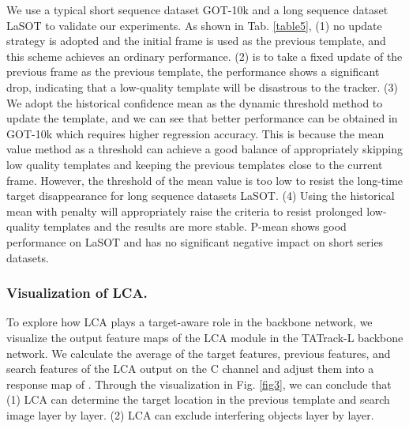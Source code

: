 \documentclass[letterpaper]{article} \usepackage{aaai23}  \usepackage{times}  \usepackage{helvet}  \usepackage{courier}  \usepackage[hyphens]{url}  \usepackage{graphicx} \urlstyle{rm} \def\UrlFont{\rm}  \usepackage{natbib}  \usepackage{caption} \frenchspacing  \setlength{\pdfpagewidth}{8.5in}  \setlength{\pdfpageheight}{11in}  \usepackage{algorithm}
\begin{document}
\begin{table}[t]
\centering
{}
\caption{Effects of different update strategies on long and short series datasets.}
\label{table5}
\end{table}


We use a typical short sequence dataset GOT-10k and a long sequence dataset LaSOT to validate our experiments. As shown in Tab. \ref{table5}, (1) no update strategy is adopted and the initial frame is used as the previous template, and this scheme achieves an ordinary performance. (2) is to take a fixed update of the previous frame as the previous template, the performance shows a significant drop, indicating that a low-quality template will be disastrous to the tracker. (3) We adopt the historical confidence mean as the dynamic threshold method to update the template, and we can see that better performance can be obtained in GOT-10k which requires higher regression accuracy. This is because the mean value method as a threshold can achieve a good balance of appropriately skipping low quality templates and keeping the previous templates close to the current frame. However, the threshold of the mean value is too low to resist the long-time target disappearance for long sequence datasets LaSOT. (4) Using the historical mean with penalty will appropriately raise the criteria to resist prolonged low-quality templates and the results are more stable. P-mean shows good performance on LaSOT and has no significant negative impact on short series datasets.

\subsubsection{Visualization of LCA.}
To explore how LCA plays a target-aware role in the backbone network, we visualize the output feature maps of the LCA module in the TATrack-L backbone network. We calculate the average of the target features, previous features, and search features of the LCA output on the C channel and adjust them into a response map of . Through the visualization in Fig. \ref{fig3}, we can conclude that (1) LCA can determine the target location in the previous template and search image layer by layer. (2) LCA can exclude interfering objects layer by layer.
\end{document}
